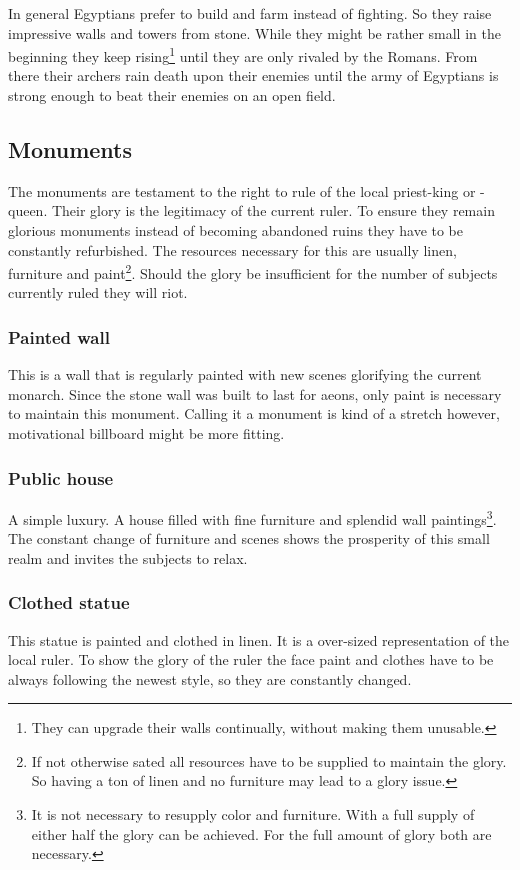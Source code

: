 In general \gls{Egyptians} prefer to build and farm instead of fighting. So
they raise impressive walls and towers from stone. While they might be rather
small in the beginning they keep rising\footnote{ They can upgrade their walls
	continually, without making them unusable. } until they are only rivaled by the
\gls{Romans}. From there their archers rain death upon their enemies until the
army of \gls{Egyptians} is strong enough to beat their enemies on an open
field.

\subsection{Monuments}
The monuments are testament to the right to rule of the local priest-king or
-queen. Their glory is the legitimacy of the current ruler. To ensure they
remain glorious monuments instead of becoming abandoned ruins they have to be
constantly refurbished. The resources necessary for this are usually linen,
furniture and paint\footnote{ If not otherwise sated all resources have to be
	supplied to maintain the glory. So having a ton of linen and no furniture may
	lead to a glory issue. }. Should the glory be insufficient for the number of
subjects currently ruled they will riot.

\subsubsection{Painted wall}
This is a wall that is regularly painted with new scenes glorifying the current
monarch. Since the stone wall was built to last for aeons, only paint is
necessary to maintain this monument. Calling it a monument is kind of a stretch
however, motivational billboard might be more fitting.

\subsubsection{Public house}
A simple luxury. A house filled with fine furniture and splendid wall
paintings\footnote{ It is not necessary to resupply color and furniture. With a
	full supply of either half the glory can be achieved. For the full amount of
	glory both are necessary. }. The constant change of furniture and scenes shows
the prosperity of this small realm and invites the subjects to relax.

\subsubsection{Clothed statue}
This statue is painted and clothed in linen. It is a over-sized representation
of the local ruler. To show the glory of the ruler the face paint and clothes
have to be always following the newest style, so they are constantly changed.

